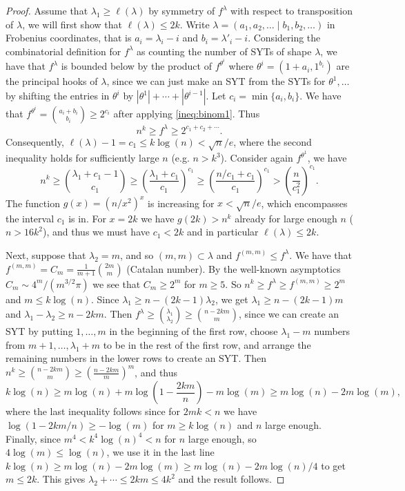 \documentclass[11pt]{amsart}
\theoremstyle{plain}
\theoremstyle{definition}
\numberwithin{equation}{section}
\newcommand{\la}{\lambda}
\def\la{\lambda}
\begin{document}
\begin{proof}
Assume that $\la_1 \geq \ell(\la)$ by symmetry of $f^\la$ with respect to transposition of $\la$, we will first show that $\ell(\la)\leq 2k$.  Write $\la=(a_1,a_2,\ldots \mid b_1,b_2,\ldots)$ in Frobenius coordinates, that is $a_i = \la_i-i$ and $b_i = \la'_i-i$. Considering the combinatorial definition for $f^\la$ as counting the number of SYTs of shape $\la$, we have that $f^\la$ is bounded below by the product of $f^{\theta^i}$ where $\theta^i = (1+a_i,1^{b_i})$ are the principal hooks of $\la$, since we can just make an SYT from the SYTs for $\theta^1,\ldots$ by shifting the entries in $\theta^i$ by $|\theta^1|+\cdots+|\theta^{i-1}|$. Let $c_i=\min\{a_i,b_i\}$. We have that $f^{\theta^i} = \binom{a_i+b_i}{b_i} \geq 2^{c_i}$ after applying \eqref{ineq:binom1}. Thus 
$$n^k \geq f^\la \geq 2^{c_1+c_2+\cdots}. $$
Consequently, $\ell(\la)-1=c_1 \leq k\log(n)<\sqrt{n}/e$, where the second inequality holds for sufficiently large $n$ (e.g. $n>k^3$). 
Consider again $f^{\theta^1}$, we have
$$n^k \geq \binom{ \la_1 + c_1-1}{c_1} \geq \left(\frac{ \la_1+c_1}{c_1}\right)^{c_1} \geq \left( \frac{n/c_1 +c_1}{c_1 }\right)^{c_1}>\left(\frac{n}{c_1^2}\right)^{c_1}.$$
The function $g(x)= (n/x^2)^x$ is increasing for $x<\sqrt{n}/e$, which encompasses the interval $c_1$ is in. For $x=2k$ we have $g(2k)>n^k$ already for large enough $n$ ($n>16k^2$), and thus we must have $c_1<2k$
 and in particular $\ell(\la)\leq 2k$.

Next, suppose that $\la_2 =m$, and so $(m,m) \subset \la$ and $f^{(m,m)}\leq f^\la$. We have that $f^{(m,m)}=C_m = \frac{1}{m+1}\binom{2m}{m}$ (Catalan number). By the well-known asymptotics $C_m \sim 4^m/(m^{3/2} \pi)$ we see that $C_m \geq 2^m$ for $m\geq 5$. So $n^k \geq f^\la \geq f^{(m,m)} \geq 2^m$ and $m\leq k\log(n)$. 
Since $\la_1 \geq n-(2k-1)\la_2$, we get $\la_1 \geq n - (2k-1)m$ and $\la_1-\la_2 \geq n-2km$. Then $f^\la \geq \binom{ \la_1}{\la_2} \geq \binom{ n-2km}{m}$, since we can create an SYT by putting $1,\ldots,m$ in the beginning of the first row, choose $\la_1-m$ numbers from $m+1,\ldots,\la_1+m$ to be in the rest of the first row, and arrange the remaining numbers in the lower rows to create an SYT. 
Then $n^k \geq \binom{n-2km}{m} \geq \left( \frac{n-2km}{m} \right)^m$, and thus
$$k \log(n) \geq m\log(n) +m \log\left(1 - \frac{2km}{n}\right) -m\log(m) \geq m\log(n) - 2m\log(m),$$
where the last inequality follows since for $2mk<n$ we have $\log(1-2km/n) \geq -\log(m)$ for $m \geq k\log(n)$ and $n$ large enough. Finally, since $m^4< k^4 \log(n)^4< n$ for $n$ large enough, so $4\log(m) \leq \log(n)$, we use it in the last line $k\log(n) \geq m\log(n) -2m \log(m)\geq  m\log(n) - 2m \log(n)/4$ to get  $m\leq 2k$.   This gives $\la_2 + \cdots \leq 2k m \leq 4k^2$ and the result follows. 
\end{proof}
\end{document}
